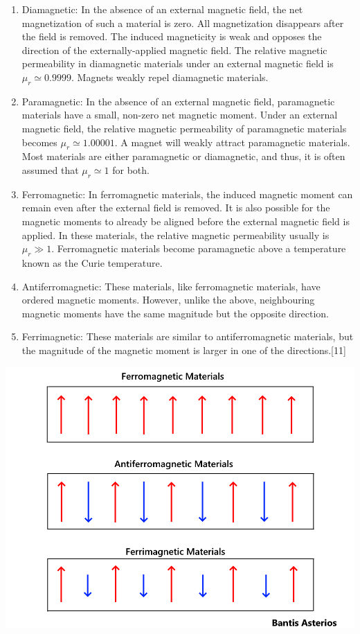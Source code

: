 \documentclass{article}
\begin{document}
\begin{enumerate}
    \item Diamagnetic: In the absence of an external magnetic field, the net magnetization of such a material is zero. All magnetization disappears after the field is removed. The induced magneticity is weak and opposes the direction of the externally-applied magnetic field. The relative magnetic permeability in diamagnetic materials under an external magnetic field is $\mu_{r} \simeq 0.9999$. Magnets weakly repel diamagnetic materials.
    \pagebreak
    \item Paramagnetic: In the absence of an external magnetic field, paramagnetic materials have a small, non-zero net magnetic moment. Under an external magnetic field, the relative magnetic permeability of paramagnetic materials becomes $\mu_{r} \simeq 1.00001$. A magnet will weakly attract paramagnetic materials. Most materials are either paramagnetic or diamagnetic, and thus, it is often assumed that $\mu_{r} \simeq 1$ for both.
    \item Ferromagnetic: In ferromagnetic materials, the induced magnetic moment can remain even after the external field is removed. It is also possible for the magnetic moments to already be aligned before the external magnetic field is applied. In these materials, the relative magnetic permeability usually is $\mu_{r} \gg 1$. Ferromagnetic materials become paramagnetic above a temperature known as the Curie temperature.
    \item Antiferromagnetic: These materials, like ferromagnetic materials, have ordered magnetic moments. However, unlike the above, neighbouring magnetic moments have the same magnitude but the opposite direction.
    \item Ferrimagnetic: These materials are similar to antiferromagnetic materials, but the magnitude of the magnetic moment is larger in one of the directions.[11]
\end{enumerate}
\begin{center}
    \includegraphics[scale=0.5]{magnetmat.png}
\end{center}
\end{document}
